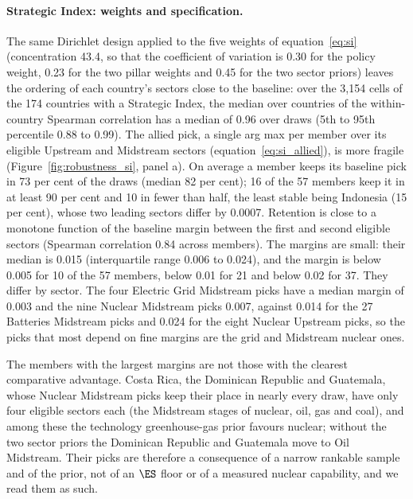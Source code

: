 \paragraph{Strategic Index: weights and specification.} The same Dirichlet design applied to
the five weights of equation~\eqref{eq:si} (concentration 43.4, so that the coefficient of
variation is 0.30 for the policy weight, 0.23 for the two pillar weights and 0.45 for the two
sector priors) leaves the ordering of each country's sectors close to the baseline: over the
3{,}154 cells of the 174 countries with a Strategic Index, the median over countries of the
within-country Spearman correlation has a median of 0.96 over draws (5th to 95th percentile
0.88 to 0.99). The allied pick, a single arg max per member over its eligible Upstream and
Midstream sectors (equation~\eqref{eq:si_allied}), is more fragile
(Figure~\ref{fig:robustness_si}, panel a). On average a member keeps its baseline pick in 73
per cent of the draws (median 82 per cent); 16 of the 57 members keep it in at least 90 per cent
and 10 in fewer than half, the least stable being Indonesia (15 per cent), whose two leading
sectors differ by 0.0007. Retention is close to a monotone function of the baseline margin
between the first and second eligible sectors (Spearman correlation 0.84 across members). The
margins are small: their median is 0.015 (interquartile range 0.006 to 0.024), and the margin is
below 0.005 for 10 of the 57 members, below 0.01 for 21 and below 0.02 for 37. They differ by
sector. The four Electric Grid Midstream picks have a median margin of 0.003 and the nine
Nuclear Midstream picks 0.007, against 0.014 for the 27 Batteries Midstream picks and 0.024 for
the eight Nuclear Upstream picks, so the picks that most depend on fine margins are the grid and
Midstream nuclear ones.

The members with the largest margins are not those with the clearest comparative advantage. Costa
Rica, the Dominican Republic and Guatemala, whose Nuclear Midstream picks keep their place in
nearly every draw, have only four eligible sectors each (the Midstream stages of nuclear, oil,
gas and coal), and among these the technology greenhouse-gas prior favours nuclear; without the
two sector priors the Dominican Republic and Guatemala move to Oil Midstream. Their picks are
therefore a consequence of a narrow rankable sample and of the prior, not of an $\ES$ floor or of
a measured nuclear capability, and we read them as such.

